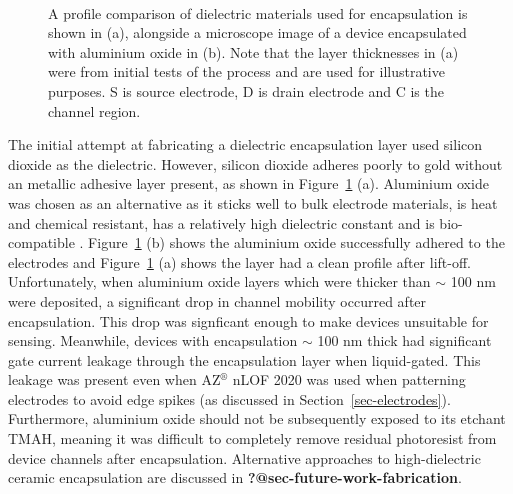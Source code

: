 \documentclass[
  a4paper,
]{scrbook}
\begin{document}
\begin{figure}
\begin{minipage}[t]{0.42\linewidth}
{{}

}

\end{minipage}%
%
\begin{minipage}[t]{0.01\linewidth}

{\centering 

~

}

\end{minipage}%

\caption{\label{fig-dektat-dielectric-layer}A profile comparison of
dielectric materials used for encapsulation is shown in (a), alongside a
microscope image of a device encapsulated with aluminium oxide in (b).
Note that the layer thicknesses in (a) were from initial tests of the
process and are used for illustrative purposes. S is source electrode, D
is drain electrode and C is the channel region.}

\end{figure}

The initial attempt at fabricating a dielectric encapsulation layer used
silicon dioxide as the dielectric. However, silicon dioxide adheres
poorly to gold without an metallic adhesive layer present, as shown in
Figure~\ref{fig-dektat-dielectric-layer} (a). Aluminium oxide was chosen
as an alternative as it sticks well to bulk electrode materials, is heat
and chemical resistant, has a relatively high dielectric constant and is
bio-compatible \autocite{Guarnieri2014,Albarghouthi2022,Kolodzey2000}.
Figure~\ref{fig-dektat-dielectric-layer} (b) shows the aluminium oxide
successfully adhered to the electrodes and
Figure~\ref{fig-dektat-dielectric-layer} (a) shows the layer had a clean
profile after lift-off. Unfortunately, when aluminium oxide layers which
were thicker than \(\sim\) 100 nm were deposited, a significant drop in
channel mobility occurred after encapsulation. This drop was signficant
enough to make devices unsuitable for sensing. Meanwhile, devices with
encapsulation \(\sim\) 100 nm thick had significant gate current leakage
through the encapsulation layer when liquid-gated. This leakage was
present even when AZ\(^\circledR\) nLOF 2020 was used when patterning
electrodes to avoid edge spikes (as discussed in
Section~\ref{sec-electrodes}). Furthermore, aluminium oxide should not
be subsequently exposed to its etchant TMAH, meaning it was difficult to
completely remove residual photoresist from device channels after
encapsulation. Alternative approaches to high-dielectric ceramic
encapsulation are discussed in \textbf{?@sec-future-work-fabrication}.
\end{document}
